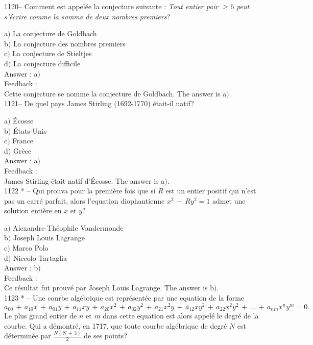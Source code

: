 ﻿\documentclass[letterpaper, 12pt]{article}
\begin{document}
1120-- Comment est appel\'ee la conjecture suivante : {\sl Tout
entier pair $\ge6$ peut s'\'ecrire comme la somme de deux nombres
premiers}?

a$)$ La conjecture de Goldbach \\
b$)$ La conjecture des nombres premiers  \\
c$)$ La conjecture de Stieltjes \\
d$)$ La conjecture difficile \\

Answer : a$)$\\

Feedback : \\
Cette conjecture se nomme la conjecture de Goldbach.
The answer is a$)$.\\

1121-- De quel pays James Stirling (1692-1770) \'etait-il natif?

a$)$ \'Ecosse \\
b$)$ \'Etats-Unis \\
c$)$ France  \\
d$)$ Gr\`ece   \\

Answer : a$)$\\

Feedback : \\
James Stirling \'etait natif d'\'Ecosse.
The answer is a$)$.\\


1122 * -- Qui prouva pour la premi\`ere fois que si $R$ est un
entier positif qui n'est pas un carr\'e parfait, alors l'equation
diophantienne $x^2\,-\,Ry^2=1$ admet une solution enti\`ere en $x$
et $y$?

a$)$ Alexandre-Th\'eophile Vandermonde \\
b$)$ Joseph Louis Lagrange \\
c$)$ Marco Polo \\
d$)$ Niccolo Tartaglia \\

Answer : b$)$\\

Feedback : \\
Ce r\'esultat fut prouv\'e par Joseph Louis Lagrange.
The answer is b$)$.\\


1123 * -- Une courbe alg\'ebrique est repr\'esent\'ee par une
equation de la forme
$$a_{00}\,+\,a_{10}x\,+\,a_{01}y\,+\,a_{11}xy\,+\,a_{20}x^2\,+\,a_{02}y^2\,+\,a_{21}x^2y\,+\,a_{12}xy^2\,+\,a_{22}x^2y^2\,+\,\ldots\,+\,a_{nm}x^ny^m=0.$$
Le plus grand entier de $n$ et $m$ dans cette equation est alors
appel\'e le degr\'e de la courbe. Qui a d\'emontr\'e, en 1717, que
toute courbe alg\'ebrique de degr\'e $N$ est d\'etermin\'ee par
$\frac{N(N\,+\,3)}2$ de ses points?
\end{document}
